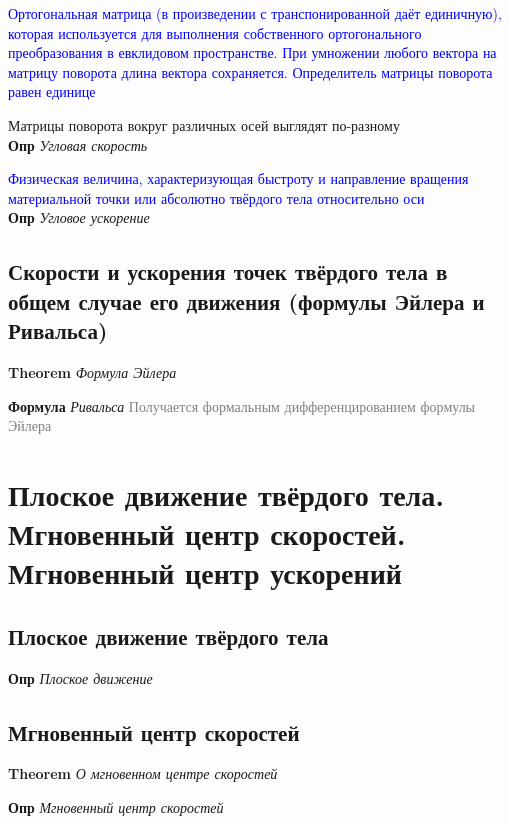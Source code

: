 \documentclass[a4paper, 14pt]{article}
\begin{document}
    \textcolor{blue}{Ортогональная матрица (в произведении с транспонированной даёт единичную), которая используется
    для выполнения собственного ортогонального преобразования в евклидовом пространстве.
    При умножении любого вектора на матрицу поворота длина вектора сохраняется.
    Определитель матрицы поворота равен единице}
    
    Матрицы поворота вокруг различных осей выглядят по-разному \\
    
    \textbf{Опр} \textit{Угловая скорость}
    
    \textcolor{blue}{Физическая величина, характеризующая быстроту и направление вращения материальной точки или
    абсолютно твёрдого тела относительно оси} \\
    
    \textbf{Опр} \textit{Угловое ускорение}
    
    \subsection{Скорости и ускорения точек твёрдого тела в общем случае его движения (формулы Эйлера и Ривальса)}
    
    \textbf{Theorem} \textit{Формула Эйлера}
    
    \textbf{Формула} \textit{Ривальса} \textcolor{gray}{Получается формальным дифференцированием формулы Эйлера}
    
    \section{Плоское движение твёрдого тела.
    Мгновенный центр скоростей.
    Мгновенный центр ускорений}
    
    \subsection{Плоское движение твёрдого тела}
    
    \textbf{Опр} \textit{Плоское движение}
    
    \subsection{Мгновенный центр скоростей}
    
    \textbf{Theorem} \textit{О мгновенном центре скоростей}
    
    \textbf{Опр} \textit{Мгновенный центр скоростей}
    
\end{document}
